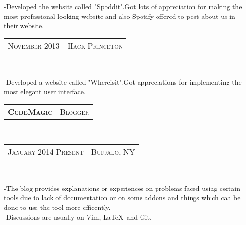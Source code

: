 \documentclass[10pt,a4paper,oneside]{article}
\begin{document}
\begin{minipage}[t]{0.33\textwidth}
        \begin{adjustwidth}{7pt}{0pt}
            {\footnotesize  -Developed the website called "Spoddit".Got lots of appreciation for 
            making the most professional looking website and also Spotify offered to post
            about us in their website.}\\
        \end{adjustwidth}
        \textcolor{light-gray}{
            \begin{tabular}{c|c}
                {\small N\textsc{ovember 2013}}
                &{\small H\textsc{ack} P\textsc{rinceton}}
            \end{tabular}
        }\\
        \vspace{-12pt}
        \begin{adjustwidth}{7pt}{0pt}
            {\footnotesize -Developed a website called "Whereisit".Got appreciations for implementing  the
            most elegant user interface.}\\
        \end{adjustwidth}
        \begin{tabular}{c|c}
            \textbf{\normalsize C\textsc{ode}M\textsc{agic}}
            &\textmd{\normalsize B\textsc{logger}}
        \end{tabular}\\
        \textcolor{light-gray}{
            \begin{tabular}{c|c}
                {\small J\textsc{anuary 2014}-P\textsc{resent}}
                &{\small B\textsc{uffalo}, NY}
            \end{tabular}
        }\\ 
        \vspace{-4mm}
        \begin{adjustwidth}{7pt}{0pt}
            {\footnotesize -The blog provides explanations or experiences on problems faced using certain tools due to lack
            of documentation or on some addons and things which can be done to use the tool more efficently.}\\
            {\footnotesize -Discussions are usually on Vim, \LaTeX \  and Git. }
        \end{adjustwidth}
        \vspace{10pt}
        \begin{comment}
            \begin{tabular}{c}
            \textbf{\normalsize A\textsc{ffiliations}}\\

\end{comment}
\end{minipage}
\end{document}
